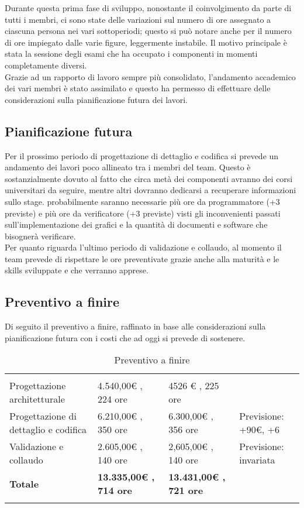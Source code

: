 Durante questa prima fase di sviluppo, nonostante il coinvolgimento da parte di tutti i membri, ci sono state delle variazioni sul numero di ore assegnato a ciascuna persona nei vari sottoperiodi; questo si può notare anche per il numero di ore impiegato dalle varie figure, leggermente instabile. Il motivo principale è stata la sessione degli esami che ha occupato i componenti in momenti completamente diversi.\\ Grazie ad un rapporto di lavoro sempre più consolidato, l'andamento accademico dei vari membri è stato assimilato e questo ha permesso di effettuare delle considerazioni sulla pianificazione futura dei lavori.

\subsection{Pianificazione futura}

Per il prossimo periodo di progettazione di dettaglio e codifica si prevede un andamento dei lavori poco allineato tra i membri del team. Questo è sostanzialmente dovuto al fatto che circa metà dei componenti avranno dei corsi universitari da seguire, mentre altri dovranno dedicarsi a recuperare informazioni sullo stage. probabilmente saranno necessarie più ore da programmatore (+3 previste) e più ore da verificatore (+3 previste) visti gli inconvenienti passati sull'implementazione dei grafici e la quantità di documenti e software che bisognerà verificare. \\ Per quanto riguarda l'ultimo periodo di validazione e collaudo, al momento il team prevede di rispettare le ore preventivate grazie anche alla maturità e le skills sviluppate e che verranno apprese.

\subsection{Preventivo a finire}
Di seguito il preventivo a finire, raffinato in base alle considerazioni sulla pianificazione futura con i costi che ad oggi si prevede di sostenere.
{
\begin{longtable}{ C{3.5cm} | C{5cm} | C{5cm} | C{2cm}} 
 	 &
 	 &
 	 & 
 	 \\
 	
 	Progettazione architetturale & 4.540,00€ , 224 ore & 4526 € , 225 ore & \begin{LARGE}\redcheck \end{LARGE}\\
 	Progettazione di dettaglio e codifica & 6.210,00€ , 350 ore & 6.300,00€ , 356 ore & Previsione: +90€, +6\\
 	Validazione e collaudo & 2.605,00€ , 140 ore  & 2,605,00€ , 140 ore   & Previsione: invariata\\
 	\textbf{Totale} & \textbf{13.335,00€ , 714 ore} & \textbf{13.431,00€ , 721 ore} &  \\
 	
 	\caption{Preventivo a finire}
\end{longtable}
}

\newpage